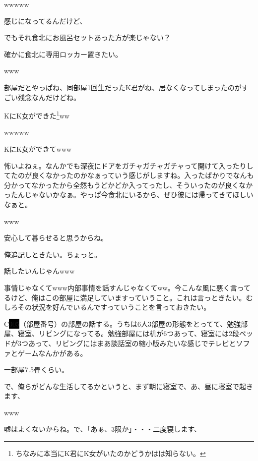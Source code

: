 \begin{multicols}{2}
  
wwwww

  
感じになってるんだけど、

  
でもそれ食北にお風呂セットあった方が楽じゃない？

  
確かに食北に専用ロッカー置きたい。

  
www

  
部屋だとやっぱね、同部屋1回生だったK君がね、居なくなってしまったのがすごい残念なんだけどね。

  
KにK女ができた\footnote{ちなみに本当にK君にK女がいたのかどうかはは知らない。}ww

  
wwwww

  
KにK女ができてwww

  
怖いよねぇ。なんかでも深夜にドアをガチャガチャガチャって開けて入ったりしてたのが良くなかったのかなぁっていう感じがしますね。入ったばかりでなんも分かってなかったから全然もうどかどか入ってったし、そういったのが良くなかったんじゃないかなぁ。やっぱ今食北にいるから、ぜひ彼には帰ってきてほしいなぁと。

  
www

  
安心して暮らせると思うからね。

  
俺追記しときたい。ちょっと。

  
話したいんじゃんwww

  
事情じゃなくてwww内部事情を話すんじゃなくてww。今こんな風に悪く言ってるけど、俺はこの部屋に満足していますっていうこと。これは言っときたい。むしろその状況を好んでいるんですっていうことを言っておきたい。

  
C\colorbox{black}{305}（部屋番号）の部屋の話する。うちは6人3部屋の形態をとってて、勉強部屋、寝室、リビングになってる。勉強部屋には机が6つあって、寝室には2段ベッドが3つあって、リビングにはまあ談話室の縮小版みたいな感じでテレビとソファとゲームなんかがある。

  
一部屋7.5畳くらい。

  
で、俺らがどんな生活してるかというと、まず朝に寝室で、あ、昼に寝室で起きます、

  
www

  
嘘はよくないからね。で、「あぁ、3限か」・・・二度寝します、


\end{multicols}
